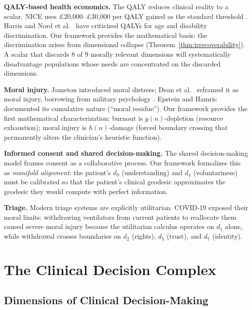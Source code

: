 \documentclass[12pt]{article}
\theoremstyle{definition}
\theoremstyle{remark}
\begin{document}
\textbf{QALY-based health economics.}  The QALY \cite{weinstein1977,drummond2015} reduces clinical reality to a scalar.  NICE uses \pounds20,000--\pounds30,000 per QALY gained as the standard threshold \cite{nice2013}.  Harris \cite{harris1987} and Nord et al.\ \cite{nord1999} have criticized QALYs for age and disability discrimination.  Our framework provides the mathematical basis: the discrimination arises from dimensional collapse (Theorem~\ref{thm:irrecoverability}).  A scalar that discards 8 of 9 morally relevant dimensions will systematically disadvantage populations whose needs are concentrated on the discarded dimensions.

\textbf{Moral injury.}  Jameton \cite{jameton1984} introduced moral distress; Dean et al.\ \cite{dean2019} reframed it as moral injury, borrowing from military psychology \cite{litz2009}.  Epstein and Hamric \cite{epstein2009} documented its cumulative nature (``moral residue'').  Our framework provides the first mathematical characterization: burnout is $g(n)$-depletion (resource exhaustion); moral injury is $h(n)$-damage (forced boundary crossing that permanently alters the clinician's heuristic function).

\textbf{Informed consent and shared decision-making.}  The shared decision-making model \cite{charles1997,elwyn2012} frames consent as a collaborative process.  Our framework formalizes this as \emph{manifold alignment}: the patient's $d_9$ (understanding) and $d_4$ (voluntariness) must be calibrated so that the patient's clinical geodesic approximates the geodesic they would compute with perfect information.

\textbf{Triage.}  Modern triage systems \cite{gilboy2011,emanuel2020} are explicitly utilitarian.  COVID-19 exposed their moral limits: withdrawing ventilators from current patients to reallocate them caused severe moral injury \cite{greenberg2020} because the utilitarian calculus operates on $d_1$ alone, while withdrawal crosses boundaries on $d_2$ (rights), $d_5$ (trust), and $d_7$ (identity).


\section{The Clinical Decision Complex}
\label{sec:manifold}

\subsection{Dimensions of Clinical Decision-Making}
\end{document}
